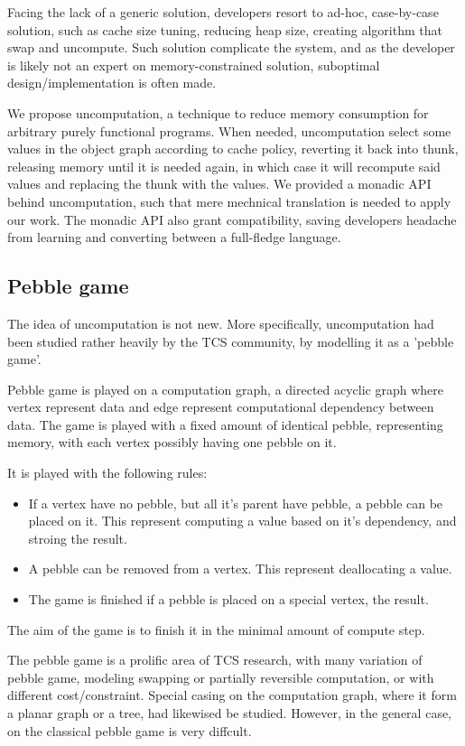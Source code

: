 Facing the lack of a generic solution, developers resort to ad-hoc, case-by-case solution, such as cache size tuning, reducing heap size, creating algorithm that swap and uncompute. Such solution complicate the system, and as the developer is likely not an expert on memory-constrained solution, suboptimal design/implementation is often made.

We propose uncomputation, a technique to reduce memory consumption for arbitrary purely functional programs. When needed, uncomputation select some values in the object graph according to cache policy, reverting it back into thunk, releasing memory until it is needed again, in which case it will recompute said values and replacing the thunk with the values. We provided a monadic API behind uncomputation, such that mere mechnical translation is needed to apply our work. The monadic API also grant compatibility, saving developers headache from learning and converting between a full-fledge language.

\subsection{Pebble game}
The idea of uncomputation is not new. More specifically, uncomputation had been studied rather heavily by the TCS community, by modelling it as a 'pebble game'. 

Pebble game is played on a computation graph, a directed acyclic graph where vertex represent data and edge represent computational dependency between data. The game is played with a fixed amount of identical pebble, representing memory, with each vertex possibly having one pebble on it. 

It is played with the following rules:
\begin{itemize}
\item If a vertex have no pebble, but all it's parent have pebble, a pebble can be placed on it. This represent computing a value based on it's dependency, and stroing the result.
\item A pebble can be removed from a vertex. This represent deallocating a value.
\item The game is finished if a pebble is placed on a special vertex, the result.
\end{itemize}

The aim of the game is to finish it in the minimal amount of compute step.

The pebble game is a prolific area of TCS research, with many variation of pebble game, modeling swapping or partially reversible computation, or with different cost/constraint. Special casing on the computation graph, where it form a planar graph or a tree, had likewised be studied. However, in the general case, on the classical pebble game is very diffcult.

